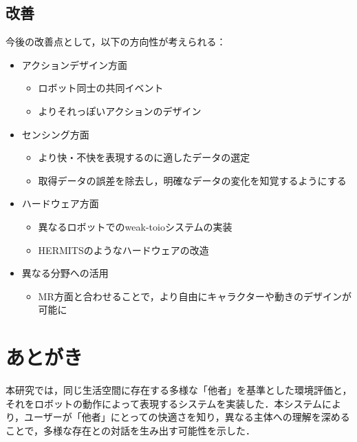 \documentclass[paper=a4paper,jafontsize=9pt,head_space=15mm,gutter=20mm,
twocolumn,number_of_lines=49, line_length=26zw]{myuarticle}
\begin{document}
\subsection{改善}
今後の改善点として，以下の方向性が考えられる：

\begin{itemize}
  \item アクションデザイン方面
    \begin{itemize}
      \item ロボット同士の共同イベント
      \item よりそれっぽいアクションのデザイン
    \end{itemize}

  \item センシング方面
    \begin{itemize}
      \item より快・不快を表現するのに適したデータの選定
      \item 取得データの誤差を除去し，明確なデータの変化を知覚するようにする
    \end{itemize}

  \item ハードウェア方面
    \begin{itemize}
      \item 異なるロボットでのweak-toioシステムの実装
      \item HERMITSのようなハードウェアの改造\cite{MITTangibleMediaGroup-2020-HERMITS}
    \end{itemize}

  \item 異なる分野への活用
    \begin{itemize}
      \item MR方面と合わせることで，より自由にキャラクターや動きのデザインが可能に
    \end{itemize}
\end{itemize}

\section{あとがき}
本研究では，同じ生活空間に存在する多様な「他者」を基準とした環境評価と，それをロボットの動作によって表現するシステムを実装した．本システムにより，ユーザーが「他者」にとっての快適さを知り，異なる主体への理解を深めることで，多様な存在との対話を生み出す可能性を示した．

\renewcommand{\refname}{　参考文献}


\end{document}
